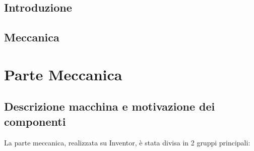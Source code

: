 \documentclass{report}
\begin{document}
\section{Introduzione}

\section{Meccanica}

\chapter{Parte Meccanica}

\section{Descrizione macchina e motivazione dei componenti}

La parte meccanica, realizzata su Inventor, è stata divisa in 2 gruppi principali:
\end{document}
